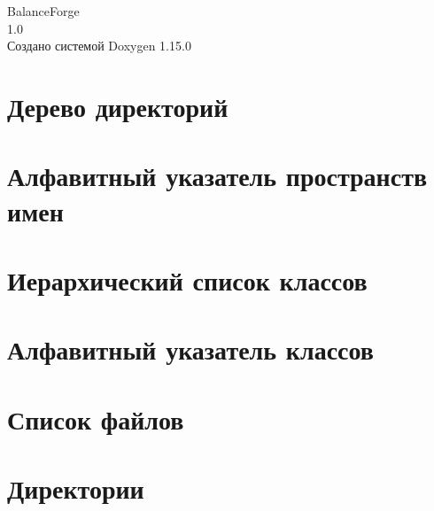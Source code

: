 \documentclass[twoside]{book}
\newcommand{\+}{\discretionary{\mbox{\scriptsize$\hookleftarrow$}}{}{}}
\newcommand{\clearemptydoublepage}{%
    \newpage{\pagestyle{empty}\cleardoublepage}%
  }
\begin{document}
  \raggedbottom
    \hypersetup{pageanchor=false,
                bookmarksnumbered=true,
                pdfencoding=unicode
               }
  \begin{titlepage}
  \vspace*{7cm}
  \begin{center}%
  {\Large Balance\+Forge}\\
  [1ex]\large 1.\+0 \\
  \vspace*{1cm}
  {\large Создано системой Doxygen 1.15.0}\\
  \end{center}
  \end{titlepage}
  \clearemptydoublepage
  \tableofcontents
  \clearemptydoublepage
  \hypersetup{pageanchor=true}
\chapter{Дерево директорий}

\chapter{Алфавитный указатель пространств имен}

\chapter{Иерархический список классов}

\chapter{Алфавитный указатель классов}

\chapter{Список файлов}

\chapter{Директории}











\end{document}
